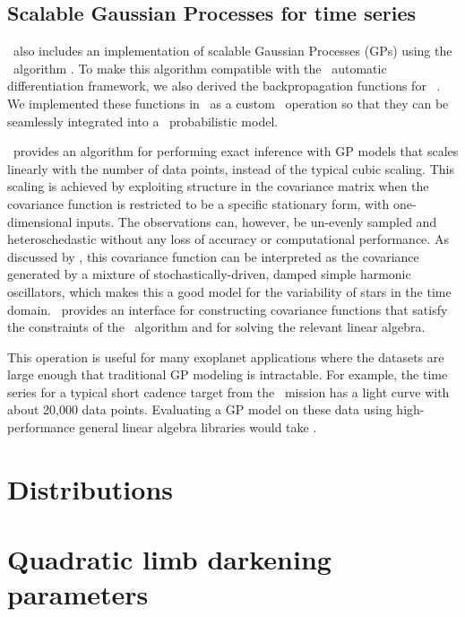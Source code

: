 \documentclass[modern]{aastex62}
\begin{document}
\subsection{Scalable Gaussian Processes for time series}

\exoplanet\ also includes an implementation of scalable Gaussian Processes (GPs) using the \celerite\ algorithm \citep{Foreman-Mackey:2017}.
To make this algorithm compatible with the \theano\ automatic differentiation framework, we also derived the backpropagation functions for \celerite\ \citep{Foreman-Mackey:2018a}.
We implemented these functions in \cpp\ as a custom \theano\ operation so that they can be seamlessly integrated into a \pymc\ probabilistic model.

\celerite\ provides an algorithm for performing exact inference with GP models that scales linearly with the number of data points, instead of the typical cubic scaling.
This scaling is achieved by exploiting structure in the covariance matrix when the covariance function is restricted to be a specific stationary form, with one-dimensional inputs.
The observations can, however, be un-evenly sampled and heteroschedastic without any loss of accuracy or computational performance.
As discussed by \citet{Foreman-Mackey:2017}, this covariance function can be interpreted as the covariance generated by a mixture of stochastically-driven, damped simple harmonic oscillators, which makes this a good model for the variability of stars in the time domain.
\exoplanet\ provides an interface for constructing covariance functions that satisfy the constraints of the \celerite\ algorithm and for solving the relevant linear algebra.

This operation is useful for many exoplanet applications where the datasets are large enough that traditional GP modeling is intractable.
For example, the time series for a typical short cadence target from the \tess\ mission has a light curve with about 20,000 data points.
Evaluating a GP model on these data using high-performance general linear algebra libraries would take .

\section{Distributions}

\section{Quadratic limb darkening parameters}
\end{document}
